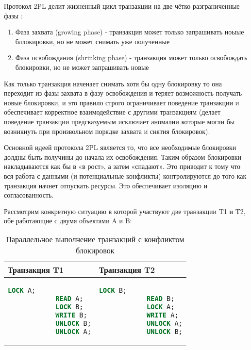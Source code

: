 Протокол 2PL делит жизненный цикл транзакции на две чётко разграниченные фазы \autocite[ch.18 §1.3]{Silberschatz}:

\begin{enumerate}
    \item Фаза захвата (growing phase) - транзакция может только запрашивать ноыые бллокировки, но не может снимать уже полученные
    \item Фаза освобождания (shrinking phase) - транзакция может только освобождать блокировки, но не может запрашивать новые
\end{enumerate}

Как только транзакция наченает снимать хотя бы одну блокировку то она переходит из фазы захвата в фазу освобождения и теряет возможность получать новые блокировки, и это правило строго ограничивает поведение транзакции и обеспечивает корректное взаимодействие с другими транзакциям (делает поведение транзакции предсказуемым \textrightarrow исключает аномалии которые могли бы возникнуть при произвольном порядке захвата и снятия блокировок). \autocites[ch.18 §1.3]{Silberschatz}[ch.22 §1.2]{ElmasriNavathe}

Основной идеей протокола 2PL является то, что все необходимые блокировки долдны быть получины до начала их освобождения. Таким образом блокировки накладываются как бы в «в рост», а затем «спадают». Это приводит к тому что вся работа с данными (и потенциальные конфликты) контролируются до того как транзакция начнет отпускать ресурсы. Это обеспечивает изоляцию и согласованность. \autocite[ch.18 §1.3]{Silberschatz}

Рассмотрим конкретную ситуацию в которой участвуют две транзакции T1 и T2, обе работающие с двумя объектами A и B:
\begin{table}[H]
    \centering
    \begin{tabular}{|p{7cm}|p{7cm}|}
        \hline
        \textbf{Транзакция T1} & \textbf{Транзакция T2} \\
        \hline
        \begin{lstlisting}[language=SQL]
            LOCK A;
            READ A;
            LOCK B;
            WRITE B;
            UNLOCK B;
            UNLOCK A;
        \end{lstlisting}
        &
        \begin{lstlisting}[language=SQL]
            LOCK B;
            READ B;
            LOCK A;
            WRITE A;
            UNLOCK A;
            UNLOCK B;
        \end{lstlisting} \\
        \hline
    \end{tabular}
    \caption{Параллельное выполнение транзакций с конфликтом блокировок}
    \label{tab:conflict_transactions}
\end{table}
    
